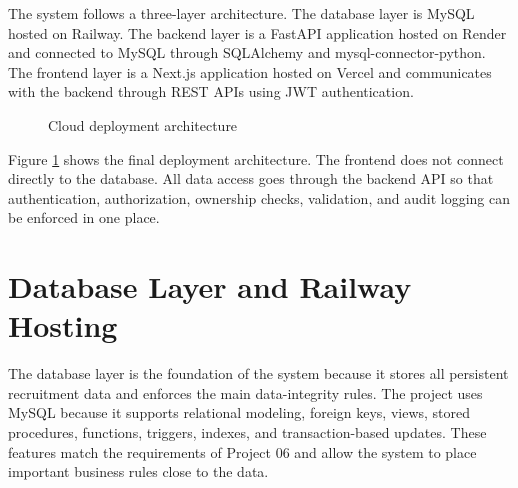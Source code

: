 \documentclass[12pt,a4paper]{report}
\begin{document}
The system follows a three-layer architecture. The database layer is MySQL hosted on Railway. The backend layer is a FastAPI application hosted on Render and connected to MySQL through SQLAlchemy and mysql-connector-python. The frontend layer is a Next.js application hosted on Vercel and communicates with the backend through REST APIs using JWT authentication.

\begin{figure}[H]
\centering
{}
\caption{Cloud deployment architecture}
\label{fig:deployment-architecture}
\end{figure}

Figure \ref{fig:deployment-architecture} shows the final deployment architecture. The frontend does not connect directly to the database. All data access goes through the backend API so that authentication, authorization, ownership checks, validation, and audit logging can be enforced in one place.

\section{Database Layer and Railway Hosting}

The database layer is the foundation of the system because it stores all persistent recruitment data and enforces the main data-integrity rules. The project uses MySQL because it supports relational modeling, foreign keys, views, stored procedures, functions, triggers, indexes, and transaction-based updates. These features match the requirements of Project 06 and allow the system to place important business rules close to the data.
\end{document}
